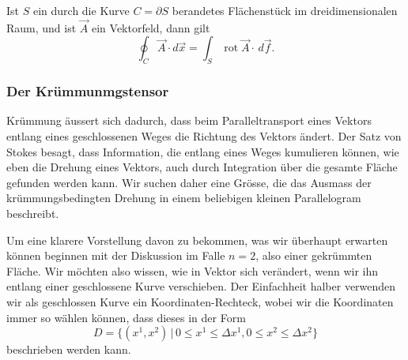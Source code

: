\begin{satz}[Stokes]
Ist $S$ ein durch die Kurve $C=\partial S$ berandetes Flächenstück
im dreidimensionalen Raum, und ist $\vec A$ ein Vektorfeld, dann gilt
\[
\oint_C \vec A\cdot d\vec{x} = \int_S\operatorname{rot}\vec A\cdot \,d\vec f.
\]
\end{satz}

\subsubsection{Der Krümmunmgstensor}
Krümmung äussert sich dadurch, dass beim Paralleltransport eines Vektors
entlang eines geschlossenen Weges die Richtung des Vektors ändert.
Der Satz von Stokes besagt, dass Information, die entlang eines
Weges kumulieren können, wie eben die Drehung eines Vektors, auch durch
Integration über die gesamte Fläche gefunden werden kann.
Wir suchen daher eine Grösse, die das Ausmass der krümmungsbedingten
Drehung in einem beliebigen kleinen Parallelogram beschreibt.

Um eine klarere Vorstellung davon zu bekommen, was wir überhaupt erwarten
können beginnen mit der Diskussion im Falle $n=2$, also einer gekrümmten
Fläche.
Wir möchten also wissen, wie in Vektor sich verändert, wenn wir ihn
entlang einer geschlossene Kurve verschieben.
Der Einfachheit halber verwenden wir als geschlossen Kurve
ein Koordinaten-Rechteck, wobei wir die Koordinaten immer so wählen
können, dass dieses in der Form
\[
D=\{ (x^1,x^2)\,|\,
0\le x^1 \le \Delta x^1, 
0\le x^2 \le \Delta x^2 \}
\]
beschrieben werden kann.

